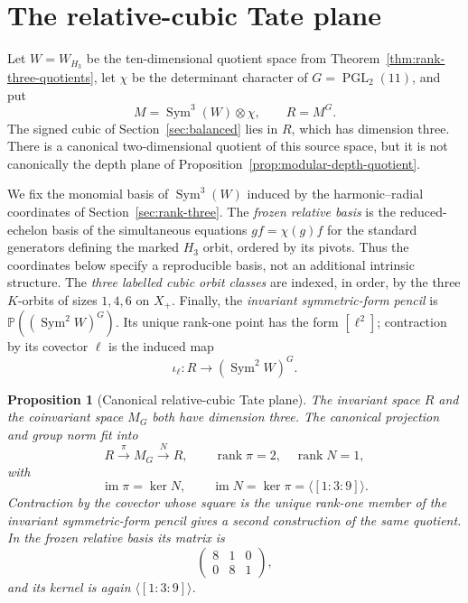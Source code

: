 \documentclass[11pt]{article}
\newtheorem{proposition}[theorem]{Proposition}
\theoremstyle{definition}
\theoremstyle{remark}
\begin{document}
\section{The relative-cubic Tate plane}
\label{app:tate-plane}

Let $W=W_{H_3}$ be the ten-dimensional quotient space from
Theorem~\ref{thm:rank-three-quotients}, let $\chi$ be the determinant
character of $G=\operatorname{PGL}_2(11)$, and put
\[
 M=\operatorname{Sym}^3(W)\otimes\chi,\qquad R=M^G.
\]
The signed cubic of Section~\ref{sec:balanced} lies in $R$, which has
dimension three.  There is a canonical two-dimensional quotient of
this source space, but it is not canonically the depth plane of
Proposition~\ref{prop:modular-depth-quotient}.

We fix the monomial basis of \(\operatorname{Sym}^3(W)\) induced by
the harmonic--radial coordinates of Section~\ref{sec:rank-three}.
The \emph{frozen relative basis} is the reduced-echelon basis of the
simultaneous equations \(gf=\chi(g)f\) for the standard generators
defining the marked \(H_3\) orbit, ordered by its pivots.  Thus the
coordinates below specify a reproducible basis, not an additional
intrinsic structure.  The \emph{three labelled cubic orbit classes}
are indexed, in order, by the three \(K\)-orbits of sizes \(1,4,6\)
on \(X_+\).  Finally, the \emph{invariant symmetric-form pencil} is
\(\mathbb P((\operatorname{Sym}^2W)^G)\).  Its unique rank-one point
has the form \([\ell^2]\); contraction by its covector \(\ell\) is
the induced map
\[
 \iota_\ell:R\longrightarrow(\operatorname{Sym}^2W)^G.
\]

\begin{proposition}[Canonical relative-cubic Tate plane]
\label{prop:relative-cubic-tate-plane}
The invariant space $R$ and the coinvariant space $M_G$ both have
dimension three.  The canonical projection and group norm fit into
\[
 R\xrightarrow{\ \pi\ }M_G\xrightarrow{\ N\ }R,
\qquad
\operatorname{rank}\pi=2,\quad\operatorname{rank}N=1,
                                                               \tag{F.1}
\]
with
\[
 \operatorname{im}\pi=\ker N,\qquad
 \operatorname{im}N=\ker\pi=\langle[1:3:9]\rangle.             \tag{F.2}
\]
Contraction by the covector whose square is the unique rank-one member
of the invariant symmetric-form pencil gives a second construction of
the same quotient.  In the frozen relative basis its matrix is
\[
 \begin{pmatrix}8&1&0\\0&8&1\end{pmatrix},
                                                               \tag{F.3}
\]
and its kernel is again $\langle[1:3:9]\rangle$.
\end{proposition}
\end{document}
